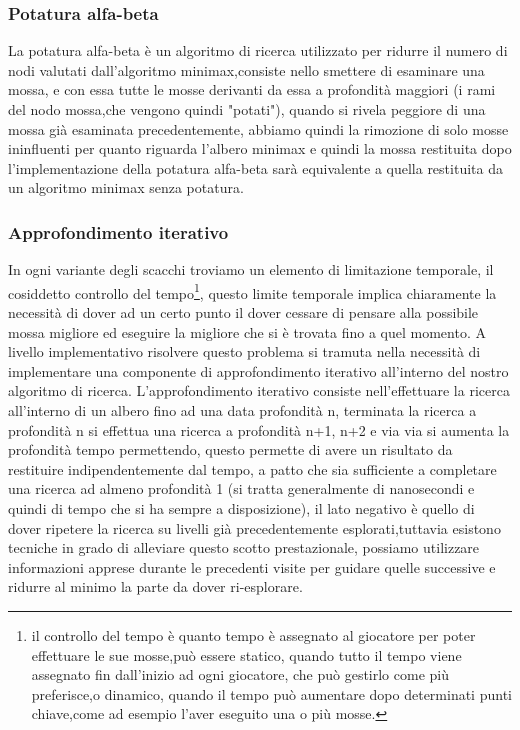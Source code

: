 \subsubsection{Potatura alfa-beta}
La potatura alfa-beta è un algoritmo di ricerca utilizzato per ridurre il numero di nodi valutati dall'algoritmo 
minimax,consiste nello smettere di esaminare una mossa, e con essa tutte le mosse derivanti da essa a profondità maggiori
(i rami del nodo mossa,che vengono quindi "potati"), quando si rivela peggiore di una mossa già esaminata precedentemente,
abbiamo quindi la rimozione di solo mosse ininfluenti per quanto riguarda l'albero minimax e quindi la mossa
restituita dopo l'implementazione della potatura alfa-beta sarà equivalente a quella restituita da un algoritmo
minimax senza potatura.

\subsubsection{Approfondimento iterativo}
In ogni variante degli scacchi troviamo un elemento di limitazione temporale, il cosiddetto controllo del tempo\footnote{il controllo del tempo è quanto tempo è assegnato al giocatore
per poter effettuare le sue mosse,può essere statico, quando tutto il tempo viene assegnato fin dall'inizio ad ogni giocatore, che può gestirlo come più preferisce,o dinamico, 
quando il tempo può aumentare dopo determinati punti chiave,come ad esempio l'aver eseguito una o più mosse.},
questo limite temporale implica chiaramente la necessità di dover ad un certo punto il dover cessare di pensare alla 
possibile mossa migliore ed eseguire la migliore che si è trovata fino a quel momento.
A livello implementativo risolvere questo problema si tramuta nella necessità di implementare una componente di approfondimento
iterativo all'interno del nostro algoritmo di ricerca.
L'approfondimento iterativo consiste nell'effettuare la ricerca all'interno di un albero fino ad una data profondità n,
terminata la ricerca a profondità n si effettua una ricerca a profondità n+1, n+2 e via via si aumenta la profondità tempo permettendo,
questo permette di avere un risultato da restituire indipendentemente dal tempo, a patto che sia sufficiente a completare una 
ricerca ad almeno profondità 1 (si tratta generalmente di nanosecondi e quindi di tempo che si ha sempre a disposizione), il lato negativo
è quello di dover ripetere la ricerca su livelli già precedentemente esplorati,tuttavia esistono tecniche in grado di alleviare questo scotto prestazionale,
possiamo utilizzare informazioni apprese durante le precedenti visite per guidare quelle successive e ridurre al minimo la parte da dover ri-esplorare.
